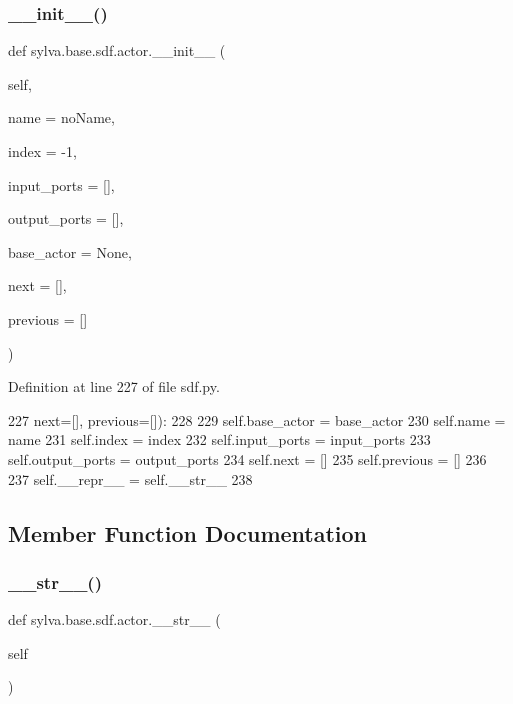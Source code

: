 \subsubsection{\texorpdfstring{\+\_\+\+\_\+init\+\_\+\+\_\+()}{\_\_init\_\_()}}
{\footnotesize\ttfamily def sylva.\+base.\+sdf.\+actor.\+\_\+\+\_\+init\+\_\+\+\_\+ (\begin{DoxyParamCaption}\item[{}]{self,  }\item[{}]{name = {\ttfamily \textquotesingle{}noName\textquotesingle{}},  }\item[{}]{index = {\ttfamily -\/1},  }\item[{}]{input\+\_\+ports = {\ttfamily \mbox{[}\mbox{]}},  }\item[{}]{output\+\_\+ports = {\ttfamily \mbox{[}\mbox{]}},  }\item[{}]{base\+\_\+actor = {\ttfamily None},  }\item[{}]{next = {\ttfamily \mbox{[}\mbox{]}},  }\item[{}]{previous = {\ttfamily \mbox{[}\mbox{]}} }\end{DoxyParamCaption})}



Definition at line 227 of file sdf.\+py.


\begin{DoxyCode}
227                      next=[], previous=[]):
228 
229             self.base\_actor = base\_actor
230             self.name = name
231             self.index = index
232             self.input\_ports = input\_ports
233             self.output\_ports = output\_ports
234             self.next = []
235             self.previous = []
236 
237             self.\_\_repr\_\_ = self.\_\_str\_\_
238 
\end{DoxyCode}


\subsection{Member Function Documentation}
\mbox{\label{classsylva_1_1base_1_1sdf_1_1actor_a248646977b9a90dee1b48077eacb9e6d}} 
\subsubsection{\texorpdfstring{\+\_\+\+\_\+str\+\_\+\+\_\+()}{\_\_str\_\_()}}
{\footnotesize\ttfamily def sylva.\+base.\+sdf.\+actor.\+\_\+\+\_\+str\+\_\+\+\_\+ (\begin{DoxyParamCaption}\item[{}]{self }\end{DoxyParamCaption})}



